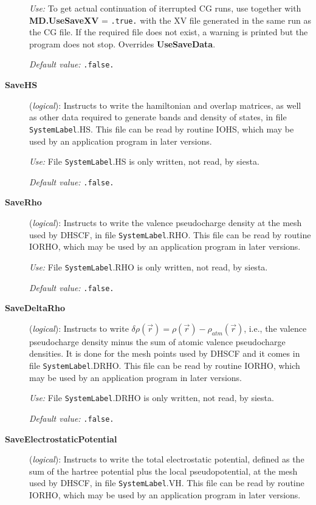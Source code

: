 \documentclass[11pt]{article}
\begin{document}
\begin{description}
{\it Use:} To get actual continuation of iterrupted CG runs, use
together with {\bf MD.UseSaveXV} = {\tt .true.} with the XV
file generated in the same run as the CG file.
If the required file does not exist, a warning is
printed but the program does not stop. Overrides {\bf UseSaveData}.

{\it Default value:} {\tt .false.}
        

\item[{\bf SaveHS}] ({\it logical}): 
Instructs to write the hamiltonian and overlap matrices, as well
as other data required to generate bands and density of states,
in file {\tt SystemLabel}.HS. This file can be read by routine IOHS,
which may be used by an application program in later versions.

{\it Use:} File {\tt SystemLabel}.HS is only written, not read, by siesta.

{\it Default value:} {\tt .false.}
        

\item[{\bf SaveRho}] ({\it logical}): 
Instructs to write the valence pseudocharge density at the
mesh used by DHSCF,
in file {\tt SystemLabel}.RHO. This file can be read by routine IORHO,
which may be used by an application program in later versions.

{\it Use:} File {\tt SystemLabel}.RHO is only written, not read, by siesta.

{\it Default value:} {\tt .false.}
        

\item[{\bf SaveDeltaRho}] ({\it logical}): 
Instructs to write $\delta \rho(\vec r) = \rho(\vec r) - \rho_{atm}(\vec r)$,
i.e., the valence pseudocharge density minus the sum of atomic valence
pseudocharge densities. It is done for the mesh points used by DHSCF and it
comes in file {\tt SystemLabel}.DRHO. This file can be read by routine IORHO,
which may be used by an application program in later versions.

{\it Use:} File {\tt SystemLabel}.DRHO is only written, not read, by siesta.

{\it Default value:} {\tt .false.}
        

\item[{\bf SaveElectrostaticPotential}] ({\it logical}): 
Instructs to write the total electrostatic potential, defined as the
sum of the hartree potential plus the local pseudopotential, at the
mesh used by DHSCF,
in file {\tt SystemLabel}.VH. This file can be read by routine IORHO,
which may be used by an application program in later versions.


\end{description}
\end{document}
